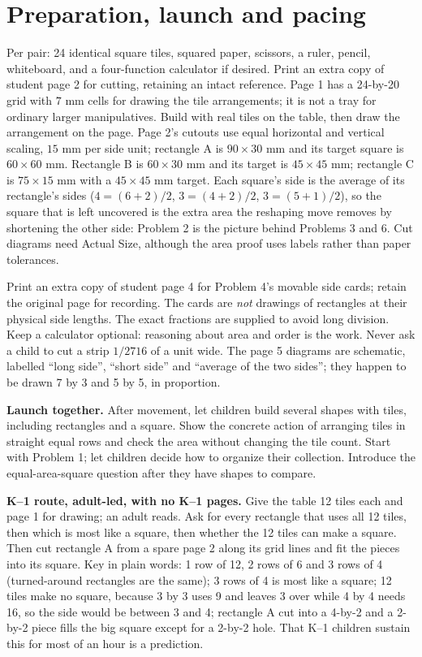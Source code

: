 \documentclass[11pt,letterpaper]{article}
\begin{document}
\section*{Preparation, launch and pacing}
Per pair: 24 identical square tiles, squared paper, scissors, a ruler, pencil, whiteboard, and a four-function calculator if desired. Print an extra copy of student page 2 for cutting, retaining an intact reference. Page 1 has a 24-by-20 grid with $7$ mm cells for drawing the tile arrangements; it is not a tray for ordinary larger manipulatives. Build with real tiles on the table, then draw the arrangement on the page. Page 2's cutouts use equal horizontal and vertical scaling, $15$ mm per side unit; rectangle A is $90\times30$ mm and its target square is $60\times60$ mm. Rectangle B is $60\times30$ mm and its target is $45\times45$ mm; rectangle C is $75\times15$ mm with a $45\times45$ mm target. Each square's side is the average of its rectangle's sides ($4=(6+2)/2$, $3=(4+2)/2$, $3=(5+1)/2$), so the square that is left uncovered is the extra area the reshaping move removes by shortening the other side: Problem 2 is the picture behind Problems 3 and 6. Cut diagrams need Actual Size, although the area proof uses labels rather than paper tolerances.

Print an extra copy of student page 4 for Problem 4's movable side cards; retain the original page for recording. The cards are \emph{not} drawings of rectangles at their physical side lengths. The exact fractions are supplied to avoid long division. Keep a calculator optional: reasoning about area and order is the work. Never ask a child to cut a strip $1/2716$ of a unit wide. The page 5 diagrams are schematic, labelled ``long side'', ``short side'' and ``average of the two sides''; they happen to be drawn 7 by 3 and 5 by 5, in proportion.

\textbf{Launch together.} After movement, let children build several shapes with tiles, including rectangles and a square. Show the concrete action of arranging tiles in straight equal rows and check the area without changing the tile count. Start with Problem 1; let children decide how to organize their collection. Introduce the equal-area-square question after they have shapes to compare.

\textbf{K--1 route, adult-led, with no K--1 pages.} Give the table 12 tiles each and page 1 for drawing; an adult reads. Ask for every rectangle that uses all 12 tiles, then which is most like a square, then whether the 12 tiles can make a square. Then cut rectangle A from a spare page 2 along its grid lines and fit the pieces into its square. Key in plain words: 1 row of 12, 2 rows of 6 and 3 rows of 4 (turned-around rectangles are the same); 3 rows of 4 is most like a square; 12 tiles make no square, because 3 by 3 uses 9 and leaves 3 over while 4 by 4 needs 16, so the side would be between 3 and 4; rectangle A cut into a 4-by-2 and a 2-by-2 piece fills the big square except for a 2-by-2 hole. That K--1 children sustain this for most of an hour is a prediction.
\end{document}
